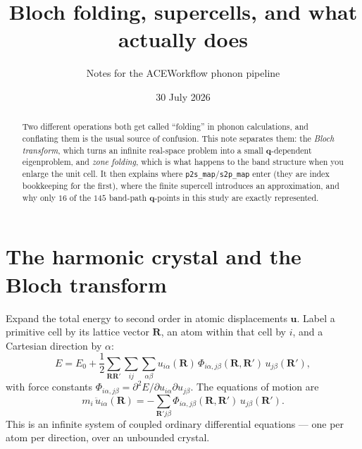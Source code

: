 \documentclass[11pt]{article}
\title{Bloch folding, supercells, and what \code{p2s\_map} actually does}
\author{Notes for the ACEWorkflow phonon pipeline}
\date{30 July 2026}
\newcommand{\code}[1]{\texttt{\small #1}}
\begin{document}
\maketitle

\begin{abstract}
\noindent
Two different operations both get called ``folding'' in phonon calculations, and
conflating them is the usual source of confusion. This note separates them: the
\emph{Bloch transform}, which turns an infinite real-space problem into a small
$\bm q$-dependent eigenproblem, and \emph{zone folding}, which is what happens to
the band structure when you enlarge the unit cell. It then explains where
\code{p2s\_map}/\code{s2p\_map} enter (they are index bookkeeping for the first),
where the finite supercell introduces an approximation, and why only $16$ of the
$145$ band-path $\bm q$-points in this study are exactly represented.
\end{abstract}

\section{The harmonic crystal and the Bloch transform}

Expand the total energy to second order in atomic displacements $\bm u$. Label a
primitive cell by its lattice vector $\bm R$, an atom within that cell by $i$,
and a Cartesian direction by $\alpha$:
%
\begin{equation}
E = E_0 + \frac12 \sum_{\bm R\bm R'}\sum_{ij}\sum_{\alpha\beta}
    u_{i\alpha}(\bm R)\,
    \Phi_{i\alpha,j\beta}(\bm R,\bm R')\,
    u_{j\beta}(\bm R'),
\label{eq:harmonic}
\end{equation}
%
with force constants $\Phi_{i\alpha,j\beta} = \partial^2 E/\partial u_{i\alpha}\partial u_{j\beta}$.
The equations of motion are
%
\begin{equation}
m_i\,\ddot u_{i\alpha}(\bm R)
  = -\sum_{\bm R' j\beta} \Phi_{i\alpha,j\beta}(\bm R,\bm R')\, u_{j\beta}(\bm R').
\label{eq:eom}
\end{equation}
%
This is an infinite system of coupled ordinary differential equations --- one per
atom per direction, over an unbounded crystal.
\end{document}
